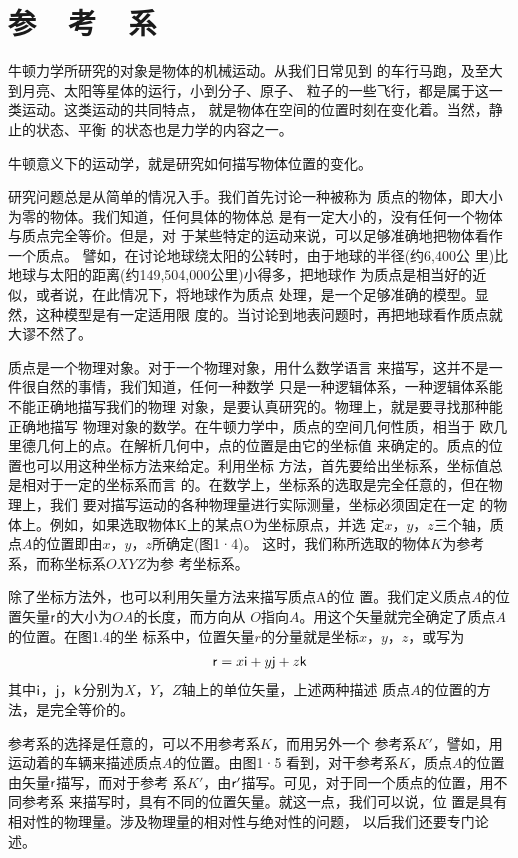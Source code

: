 \section[参考系]{参~~考~~系}
\label{sec:01.04}
    牛顿力学所研究的对象是物体的机械运动。从我们日常见到
的车行马跑，及至大到月亮、太阳等星体的运行，小到分子、原子、
粒子的一些飞行，都是属于这一类运动。这类运动的共同特点，
就是物体在空间的位置时刻在变化着。当然，静止的状态、平衡
的状态也是力学的内容之一。

    牛顿意义下的运动学，就是研究如何描写物体位置的变化。

\renewcommand{\hsp}{\hspace{0.1em}}
    研究问题总是从简单的情况入手。我们首先讨论一种被称为
质点的物体，即大小为零的物体。我们知道，任何具体的物体总
是有一定大小的，没有任何一个物体与质点完全等价。但是，对
于某些特定的运动来说，可以足够准确地把物体看作一个质点。
譬如，在讨论地球绕太阳的公转时，由于地球的半径\hsp(约\hsp 6,400\hsp 公
里)\hsp 比地球与太阳的距离\hsp (约\hsp 149,504,000\hsp 公里)\hsp 小得多，把地球作
为质点是相当好的近似，或者说，在此情况下，将地球作为质点
处理，是一个足够准确的模型。显然，这种模型是有一定适用限
度的。当讨论到地表问题时，再把地球看作质点就大谬不然了。

质点是一个物理对象。对于一个物理对象，用什么数学语言
来描写，这并不是一件很自然的事情，我们知道，任何一种数学
只是一种逻辑体系，一种逻辑体系能不能正确地描写我们的物理
对象，是要认真研究的。物理上，就是要寻找那种能正确地描写
物理对象的数学。在牛顿力学中，质点的空间几何性质，相当于
欧几里德几何上的点。在解析几何中，点的位置是由它的坐标值
来确定的。质点的位置也可以用这种坐标方法来给定。利用坐标
方法，首先要给出坐标系，坐标值总是相对于一定的坐标系而言
的。在数学上，坐标系的选取是完全任意的，但在物理上，我们
要对描写运动的各种物理量进行实际测量，坐标必须固定在一定
的物体上。例如，如果选取物体K上的某点O为坐标原点，并选
定$x$，$y$，$z$三个轴，质点$A$的位置即由$x$，$y$，$z$所确定(图1·4)。
这时，我们称所选取的物体$K$为参考系，而称坐标系$OXYZ$为参
考坐标系。

除了坐标方法外，也可以利用矢量方法来描写质点A的位
置。我们定义质点$A$的位置矢量${\sf r}$的大小为$OA$的长度，而方向从
$O$指向$A$。用这个矢量就完全确定了质点$A$的位置。在图1.4的坐
标系中，位置矢量$r$的分量就是坐标$x$，$y$，$z$，或写为
\begin{align}\label{equ:01.04.01}
    {\sf r}=x{\sf i}+y{\sf j}+z{\sf k}
\end{align}
其中${\sf i}$，${\sf j}$，${\sf k}$分别为$X$，$Y$，$Z$轴上的单位矢量，上述两种描述
质点$A$的位置的方法，是完全等价的。

参考系的选择是任意的，可以不用参考系$K$，而用另外一个
参考系$K'$，譬如，用运动着的车辆来描述质点$A$的位置。由图1·5
看到，对干参考系$K$，质点$A$的位置由矢量${\sf r}$描写，而对于参考
系$K'$，由${\sf r'}$描写。可见，对于同一个质点的位置，用不同参考系
来描写时，具有不同的位置矢量。就这一点，我们可以说，位
置是具有相对性的物理量。涉及物理量的相对性与绝对性的问题，
以后我们还要专门论述。